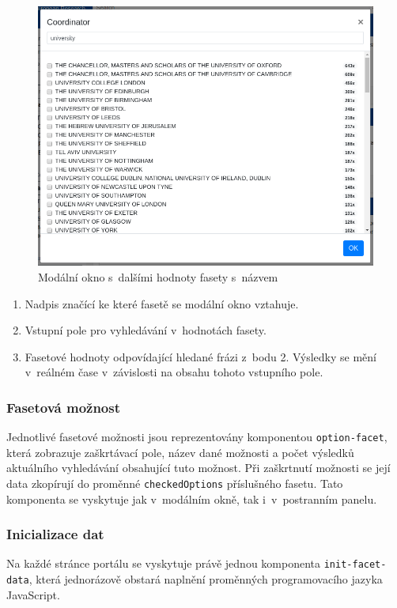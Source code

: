 \begin{figure}[H]
	\centering
	\includegraphics[width=\textwidth]{obrazky-figures/my-modal.png}
	\caption{Modální okno s~dalšími hodnoty fasety s~názvem }
	\label{img:modal}
\end{figure}
\begin{enumerate}
    \item Nadpis značící ke které fasetě se modální okno vztahuje.
    \item Vstupní pole pro vyhledávání v~hodnotách fasety.
    \item Fasetové hodnoty odpovídající hledané frázi z~bodu 2. Výsledky se mění v~reálném čase v~závislosti na obsahu tohoto vstupního pole.
\end{enumerate}

\subsubsection*{Fasetová možnost}
Jednotlivé fasetové možnosti jsou reprezentovány komponentou \texttt{option-facet}, která zobrazuje zaškrtávací pole, název dané možnosti a počet výsledků aktuálního vyhledávání obsahující tuto možnost. Při zaškrtnutí možnosti se její data zkopírují do proměnné \texttt{checkedOptions} příslušného fasetu. Tato komponenta se vyskytuje jak v~modálním okně, tak i~v~postranním panelu.

\subsubsection*{Inicializace dat}
Na každé stránce portálu se vyskytuje právě jednou komponenta \texttt{init-facet-data}, která jednorázově obstará naplnění proměnných programovacího jazyka JavaScript.

